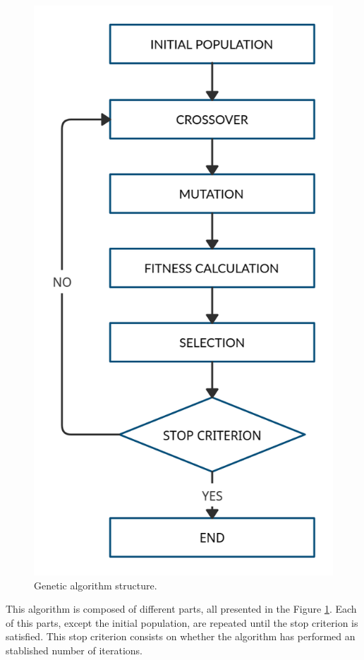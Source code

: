 \documentclass[letterpaper]{article} %
\begin{document}
\begin{figure}[H]
    \includegraphics[scale=0.3]{img/GeneticAlg.png}
    \caption{Genetic algorithm structure.}
    \label{fig:GAlg}
\end{figure}

This algorithm is composed of different parts, all presented in the Figure \ref{fig:GAlg}. Each of this parts, except the initial population, are repeated until the stop criterion is satisfied. This stop criterion consists on whether the algorithm has performed an stablished number of iterations.
\end{document}
